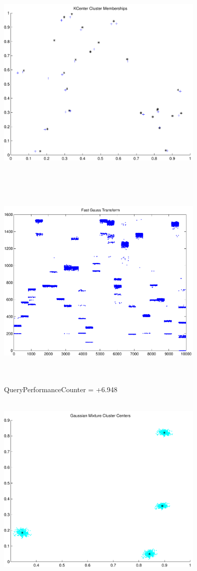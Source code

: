 \documentclass[9pt]{article}
\theoremstyle{plain}
\theoremstyle{definition}
\theoremstyle{remark}
\numberwithin{equation}{section}
\begin{document}
\includegraphics[width=10.0cm,height=10.0cm]{KCenterClusterMemberships_24_Centers.pdf}

\includegraphics[width=10.0cm,height=10.0cm]{FGT24_Centers.pdf}

QueryPerformanceCounter  =  +6.948
\includegraphics[width=10.0cm,height=10.0cm]{GaussianMixture_ClusterCenters4_Centers.pdf}
\end{document}

